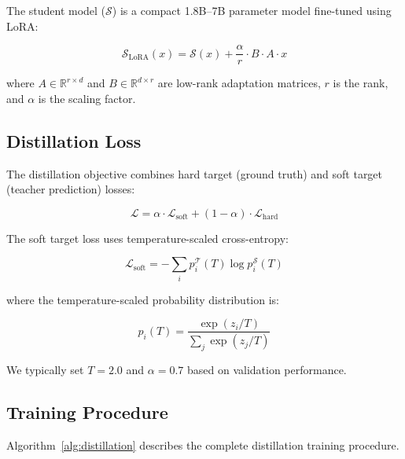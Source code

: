 \documentclass[11pt,a4paper]{article}
\begin{document}
The student model ($\mathcal{S}$) is a compact 1.8B--7B parameter model fine-tuned using LoRA:

\begin{equation}
    \mathcal{S}_{\text{LoRA}}(x) = \mathcal{S}(x) + \frac{\alpha}{r} \cdot B \cdot A \cdot x
\end{equation}

where $A \in \mathbb{R}^{r \times d}$ and $B \in \mathbb{R}^{d \times r}$ are low-rank adaptation matrices, $r$ is the rank, and $\alpha$ is the scaling factor.

\subsection{Distillation Loss}

The distillation objective combines hard target (ground truth) and soft target (teacher prediction) losses:

\begin{equation}
    \mathcal{L} = \alpha \cdot \mathcal{L}_{\text{soft}} + (1-\alpha) \cdot \mathcal{L}_{\text{hard}}
\end{equation}

The soft target loss uses temperature-scaled cross-entropy:

\begin{equation}
    \mathcal{L}_{\text{soft}} = -\sum_i p_i^{\mathcal{T}}(T) \log p_i^{\mathcal{S}}(T)
\end{equation}

where the temperature-scaled probability distribution is:

\begin{equation}
    p_i(T) = \frac{\exp(z_i/T)}{\sum_j \exp(z_j/T)}
\end{equation}

We typically set $T=2.0$ and $\alpha=0.7$ based on validation performance.

\subsection{Training Procedure}

Algorithm~\ref{alg:distillation} describes the complete distillation training procedure.
\end{document}
